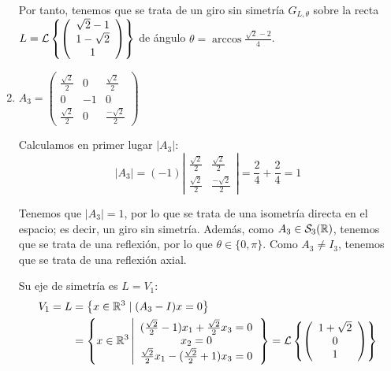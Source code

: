 \begin{ejercicio}
\begin{enumerate}
        Por tanto, tenemos que se trata de un giro sin simetría $G_{L,\theta}$ sobre la recta $L=\mathcal{L}\left\{\left(\begin{array}{c}
                     \sqrt{2}-1 \\ 1-\sqrt{2} \\ 1
                \end{array}\right)\right\}$ de ángulo $\theta=\arccos{\frac{\sqrt{2}-2}{4}}$.




        \item $A_3=\left(\begin{array}{ccc}
            \frac{\sqrt{2}}{2} & 0 & \frac{\sqrt{2}}{2} \\
            0 & -1 & 0 \\
            \frac{\sqrt{2}}{2} & 0 & \frac{-\sqrt{2}}{2}
        \end{array}\right)$

        Calculamos en primer lugar $|A_3|$:
        \begin{equation*}
            |A_3| = (-1) \left|\begin{array}{cc}
            \frac{\sqrt{2}}{2} & \frac{\sqrt{2}}{2} \\
            \frac{\sqrt{2}}{2} & \frac{-\sqrt{2}}{2}
        \end{array}\right| = \frac{2}{4} +  \frac{2}{4} = 1
        \end{equation*}

        Tenemos que $|A_3|=1$, por lo que se trata de una isometría directa en el espacio; es decir, un giro sin simetría. Además, como $A_3\in \mathcal{S}_3(\mathbb{R})$, tenemos que se trata de una reflexión, por lo que $\theta\in \{0,\pi\}$. Como $A_3\neq I_3$, tenemos que se trata de una reflexión axial.

        Su eje de simetría es $L=V_{1}$:
        \begin{equation*}
            \begin{split}
                V_{1}=L& = \left\{x\in \mathbb{R}^3 \mid (A_3-I)x=0\right\}\\
                & = \left\{x\in \mathbb{R}^3 \left|
                \begin{array}{c}
                    (\frac{\sqrt{2}}{2}-1)x_1 + \frac{\sqrt{2}}{2}x_3 =0 \\
                    x_2 = 0 \\
                    \frac{\sqrt{2}}{2} x_1 -(\frac{\sqrt{2}}{2}+1)x_3=0
                \end{array}
                \right.\right\}
                = \mathcal{L}\left\{\left(\begin{array}{c}
                     1+\sqrt{2} \\ 0 \\ 1
                \end{array}\right)\right\}
            \end{split}
        \end{equation*}



\end{enumerate}
\end{ejercicio}

